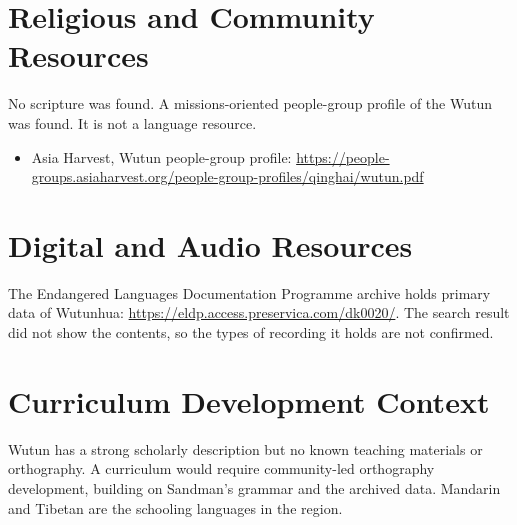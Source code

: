 \documentclass[12pt]{article}
\begin{document}
\section{Religious and Community Resources}
No scripture was found. A missions-oriented people-group profile of the Wutun was found. It is not a language resource.
\begin{itemize}
\item Asia Harvest, Wutun people-group profile: \url{https://people-groups.asiaharvest.org/people-group-profiles/qinghai/wutun.pdf}
\end{itemize}

\section{Digital and Audio Resources}
The Endangered Languages Documentation Programme archive holds primary data of Wutunhua: \url{https://eldp.access.preservica.com/dk0020/}. The search result did not show the contents, so the types of recording it holds are not confirmed.

\section{Curriculum Development Context}
Wutun has a strong scholarly description but no known teaching materials or orthography. A curriculum would require community-led orthography development, building on Sandman's grammar and the archived data. Mandarin and Tibetan are the schooling languages in the region.
\end{document}
